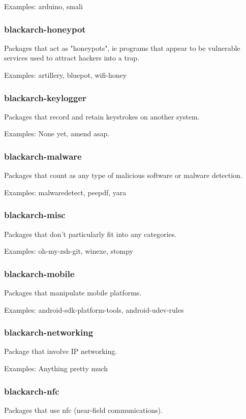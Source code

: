\documentclass[a4paper, oneside, 11pt]{book}
\begin{document}
Examples: arduino, smali

\subsubsection{blackarch-honeypot}
Packages that act as "honeypots", ie programs that appear to
be vulnerable services used to attract hackers into a trap.

Examples: artillery, bluepot, wifi-honey

\subsubsection{blackarch-keylogger}
Packages that record and retain keystrokes on another system.

Examples: None yet, amend asap.

\subsubsection{blackarch-malware}
Packages that count as any type of malicious software or
malware detection.

Examples: malwaredetect, peepdf, yara

\subsubsection{blackarch-misc}
Packages that don't particularly fit into any categories.

Examples: oh-my-zsh-git, winexe, stompy

\subsubsection{blackarch-mobile}
Packages that manipulate mobile platforms.

Examples: android-sdk-platform-tools, android-udev-rules

\subsubsection{blackarch-networking}
Package that involve IP networking.

Examples: Anything pretty much

\subsubsection{blackarch-nfc}
Packages that use nfc (near-field communications).
\end{document}
